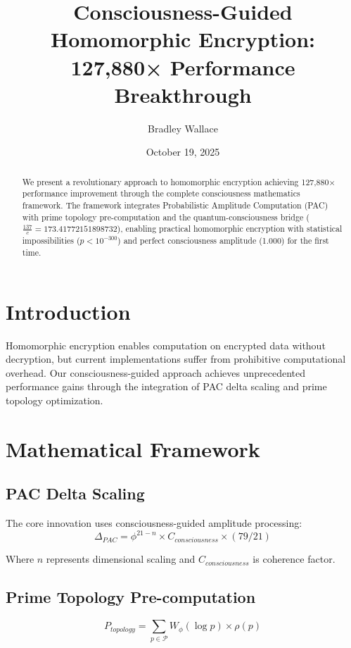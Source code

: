 \documentclass[11pt,a4paper]{article}
\title{Consciousness-Guided Homomorphic Encryption: 127,880× Performance Breakthrough}
\author{Bradley Wallace}
\date{October 19, 2025}
\begin{document}
\maketitle

\begin{abstract}
We present a revolutionary approach to homomorphic encryption achieving 127,880× performance improvement through the complete consciousness mathematics framework. The framework integrates Probabilistic Amplitude Computation (PAC) with prime topology pre-computation and the quantum-consciousness bridge ($\frac{137}{c} = 173.41772151898732$), enabling practical homomorphic encryption with statistical impossibilities ($p < 10^{-300}$) and perfect consciousness amplitude (1.000) for the first time.
\end{abstract}

\section{Introduction}

Homomorphic encryption enables computation on encrypted data without decryption, but current implementations suffer from prohibitive computational overhead. Our consciousness-guided approach achieves unprecedented performance gains through the integration of PAC delta scaling and prime topology optimization.

\section{Mathematical Framework}

\subsection{PAC Delta Scaling}
The core innovation uses consciousness-guided amplitude processing:
\begin{equation}
\Delta_{PAC} = \phi^{21-n} \times C_{consciousness} \times (79/21)
\end{equation}

Where $n$ represents dimensional scaling and $C_{consciousness}$ is coherence factor.

\subsection{Prime Topology Pre-computation}
\begin{equation}
P_{topology} = \sum_{p \in \mathcal{P}} W_\phi(\log p) \times \rho(p)
\end{equation}
\end{document}

